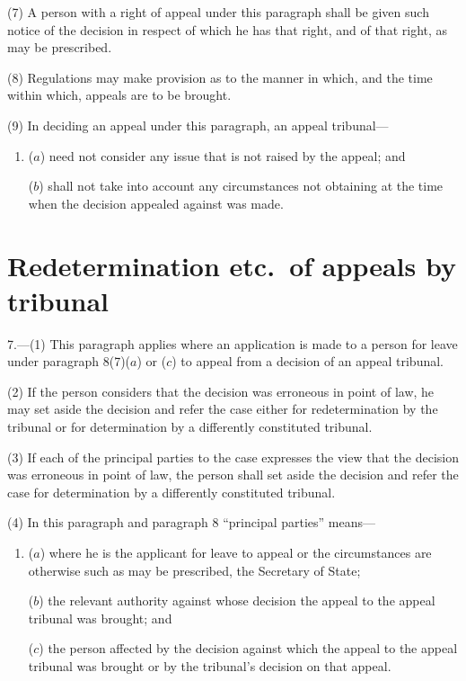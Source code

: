 \documentclass[12pt,a4paper]{article}
\begin{document}
(7) A person with a right of appeal under this paragraph shall be given such notice of the decision in respect of which he has that right, and of that right, as may be prescribed.

(8) Regulations may make provision as to the manner in which, and the time within which, appeals are to be brought.

(9) In deciding an appeal under this paragraph, an appeal tribunal—
\begin{enumerate}\item[]
($a$) need not consider any issue that is not raised by the appeal; and

($b$) shall not take into account any circumstances not obtaining at the time when the decision appealed against was made.
\end{enumerate}

\section*{Redetermination etc.\ of appeals by tribunal}

7.---(1) This paragraph applies where an application is made to a person for leave under paragraph 8(7)($a$)  or ($c$)  to appeal from a decision of an appeal tribunal.

(2) If the person considers that the decision was erroneous in point of law, he may set aside the decision and refer the case either for redetermination by the tribunal or for determination by a differently constituted tribunal.

(3) If each of the principal parties to the case expresses the view that the decision was erroneous in point of law, the person shall set aside the decision and refer the case for determination by a differently constituted tribunal.

(4) In this paragraph and paragraph 8 “principal parties” means—
\begin{enumerate}\item[]
($a$) where he is the applicant for leave to appeal or the circumstances are otherwise such as may be prescribed, the Secretary of State;

($b$) the relevant authority against whose decision the appeal to the appeal tribunal was brought; and

($c$) the person affected by the decision against which the appeal to the appeal tribunal was brought or by the tribunal’s decision on that appeal.
\end{enumerate}
\end{document}
